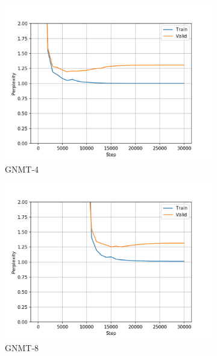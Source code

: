 \begin{figure}[H]
\begin{subfigure}{0.45\textwidth}
\includegraphics[width=\textwidth]{../results/monument2_1/run1/wmt16_gnmt_4_layer/ppls.png} 
\caption{GNMT-4}
\label{fig:monu1 gnmt4 ppl}
\end{subfigure}
\hfill
\begin{subfigure}{0.45\textwidth}
\includegraphics[width=\textwidth]{../results/monument2_1/run1/wmt16_gnmt_8_layer/ppls.png}
\caption{GNMT-8}
\label{fig:monu1 gnmt8 ppl}
\end{subfigure}
\hfill
\begin{subfigure}{0.45\textwidth}

\end{subfigure}
\end{figure}
